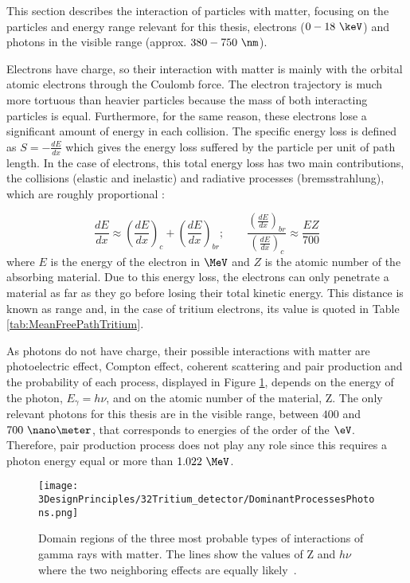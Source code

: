 This section describes the interaction of particles with matter, focusing on the particles and energy range relevant for this thesis, electrons ($0-18~\keV$) and photons in the visible range (approx. $380-750~\nm$).

Electrons have charge, so their interaction with matter is mainly with the orbital atomic  electrons through the Coulomb force. The electron trajectory is much more tortuous than heavier particles because the mass of both interacting particles is equal. Furthermore, for the same reason, these electrons lose a significant amount of energy in each collision. The specific energy loss is defined as $S=-\displaystyle{\frac{dE}{dx}}$ which gives the energy loss suffered by the particle per unit of path length. In the case of electrons, this total energy loss has two main contributions, the collisions (elastic and inelastic) and radiative processes (bremsstrahlung), which are roughly proportional \cite{Knoll, Leo}:

\begin{equation}
\frac{dE}{dx} \approx \left(\frac{dE}{dx}\right)_{c} + \left(\frac{dE}{dx}\right)_{br} ; \qquad \frac{\displaystyle{\left(\frac{dE}{dx}\right)_{br}}}{\displaystyle{\left(\frac{dE}{dx}\right)_{c}}} \approx \frac{EZ}{700}
\label{eq:ElectronInteraction}
\end{equation}
where $E$ is the energy of the electron in $\MeV$ and $Z$ is the atomic number of the absorbing material. Due to this energy loss, the electrons can only penetrate a material as far as they go before losing their total kinetic energy. This distance is known as range and, in the case of tritium electrons, its value is quoted in Table \ref{tab:MeanFreePathTritium}.

As photons do not have charge, their possible interactions with matter are photoelectric effect, Compton effect, coherent scattering and pair production and the probability of each process, displayed in Figure \ref{fig:ProcessesPhotons}, depends on the energy of the photon, $E_\gamma = h\nu$, and on the atomic number of the material, Z. The only relevant photons for this thesis are in the visible range, between $400$ and $700~\nano\meter$, that corresponds to energies of the order of the $\eV$. Therefore, pair production process does not play any role since this requires a photon energy equal or more than $1.022~\MeV$.

\begin{figure}[h]
\centering
\texttt{[image: 3DesignPrinciples/32Tritium\_detector/DominantProcessesPhotons.png]}
\caption{Domain regions of the three most probable types of interactions of gamma rays with matter. The lines show the values of Z and $h\nu$ where the two neighboring effects are equally likely\label{fig:ProcessesPhotons}~\cite{Knoll}.}
\end{figure}

